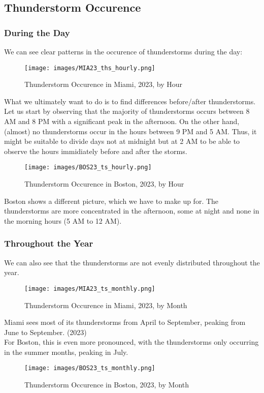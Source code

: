 \documentclass[12pt, parskip=half]{scrartcl}
\begin{document}
\subsection{Thunderstorm Occurence}

\subsubsection{During the Day}
We can see clear patterns in the occurence of thunderstorms during the day:
\begin{figure}[!h]
\centering
\texttt{[image: images/MIA23\_ths\_hourly.png]}
\caption{Thunderstorm Occurence in Miami, 2023, by Hour}
\end{figure}

What we ultimately want to do is to find differences before/after thunderstorms. 
Let us start by observing that the majority of thunderstorms occurs between 8 AM and 8 PM with a significant peak in the afternoon. 
On the other hand, (almost) no thunderstorms occur in the hours between 9 PM and 5 AM. 
Thus, it might be suitable to divide days not at midnight but at 2 AM to be able to observe the hours immidiately before and after the storms.\\

\begin{figure}[!h]
\centering
\texttt{[image: images/BOS23\_ts\_hourly.png]}
\caption{Thunderstorm Occurence in Boston, 2023, by Hour}
\end{figure}
Boston shows a different picture, which we have to make up for.
The thunderstorms are more concentrated in the afternoon, some at night and none in the morning hours (5 AM to 12 AM).

\subsubsection{Throughout the Year}
We can also see that the thunderstorms are not evenly distributed throughout the year.

\begin{figure}[!h]
\centering
\texttt{[image: images/MIA23\_ts\_monthly.png]}
\caption{Thunderstorm Occurence in Miami, 2023, by Month}
\end{figure}

Miami sees most of its thunderstorms from April to September, peaking from June to September. (2023)\\
For Boston, this is even more pronounced, with the thunderstorms only occurring in the summer months, peaking in July.
\begin{figure}[!h]
\centering
\texttt{[image: images/BOS23\_ts\_monthly.png]}
\caption{Thunderstorm Occurence in Boston, 2023, by Month}
\end{figure}
\end{document}
